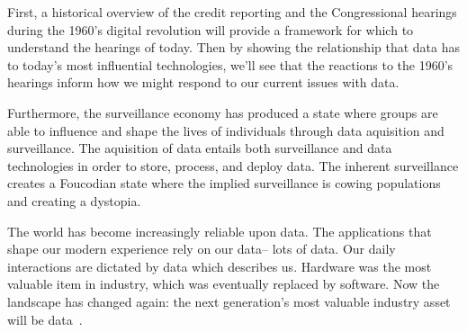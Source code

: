 First, a historical overview of the credit reporting and the Congressional
hearings during the 1960's digital revolution will provide a framework for
which to understand the hearings of today. Then by showing the relationship
that data has to today's most influential technologies, we'll see that the
reactions to the 1960's hearings inform how we might respond to our current
issues with data.

Furthermore, the surveillance economy has produced a state where groups are
able to influence and shape the lives of individuals through data aquisition
and surveillance. The aquisition of data entails both surveillance and data
technologies in order to store, process, and deploy data. The inherent
surveillance creates a Foucodian state where the implied surveillance is cowing
populations and creating a dystopia.

The world has become increasingly reliable upon data. The applications that
shape our modern experience rely on our data-- lots of data. Our daily
interactions are dictated by data which describes us. Hardware was the most
valuable item in industry, which was eventually replaced by software. Now the
landscape has changed again: the next generation's most valuable industry asset
will be data~\cite{janeway2018doing}.





